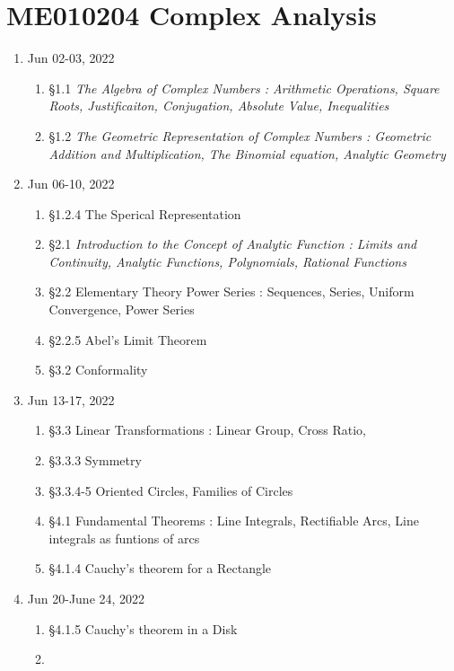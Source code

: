 \chapter{ME010204 Complex Analysis}
\begin{enumerate}[label=Week \arabic*]
	\item Jun 02-03, 2022
	\begin{enumerate}[label=Day \arabic*]
		\item
			\S1.1 \textit{The Algebra of Complex Numbers : Arithmetic Operations, Square Roots, Justificaiton, Conjugation, Absolute Value, Inequalities}
		\item
			\S1.2 \textit{The Geometric Representation of Complex Numbers : Geometric Addition and Multiplication, The Binomial equation, Analytic Geometry}
	\end{enumerate}
	\item Jun 06-10, 2022 
	\begin{enumerate}[label=Day \arabic*]
		\item 
			\S1.2.4 The Sperical Representation
		\item 
			\S2.1 \textit{Introduction to the Concept of Analytic Function : Limits and Continuity, Analytic Functions, Polynomials, Rational Functions}
		\item 
			\S2.2 Elementary Theory Power Series : Sequences, Series, Uniform Convergence, Power Series
		\item 
			\S2.2.5 Abel's Limit Theorem
		\item 
			\S3.2 Conformality
	\end{enumerate}
	\item Jun 13-17, 2022 
	\begin{enumerate}[label=Day \arabic*]
		\item 
			\S3.3 Linear Transformations : Linear Group, Cross Ratio,
		\item  
			\S3.3.3 Symmetry
		\item 
			\S3.3.4-5 Oriented Circles, Families of Circles
		\item 
			\S4.1 Fundamental Theorems : Line Integrals, Rectifiable Arcs, Line integrals as funtions of arcs
		\item 
			\S4.1.4 Cauchy's theorem for a Rectangle
	\end{enumerate}
	\item Jun 20-June 24, 2022 
	\begin{enumerate}[label=Day \arabic*]
		\item 
			\S4.1.5 Cauchy's theorem in a Disk
		\item 

\end{enumerate}
\end{enumerate}
